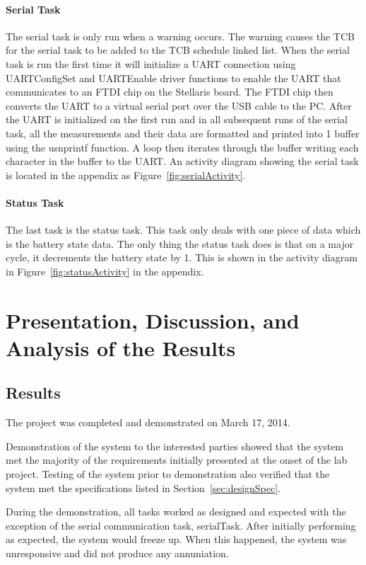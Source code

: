 \documentclass[12pt]{article} %
\begin{document}
    \paragraph{Serial Task} The serial task is only run when a warning occurs.
    The warning causes the TCB for the serial task to be added to the TCB
    schedule linked list. When the serial task is run the first time it will
    initialize a UART connection using UARTConfigSet and UARTEnable driver
    functions to enable the UART that communicates to an FTDI chip on the
    Stellaris board. The FTDI chip then converts the UART to a virtual serial
    port over the USB cable to the PC. After the UART is initialized on the
    first run and in all subsequent runs of the serial task, all the
    measurements and their data are formatted and printed into 1 buffer using
    the usnprintf function. A loop then iterates through the buffer writing
    each character in the buffer to the UART. An activity diagram showing the
    serial task is located in the appendix as Figure~\ref{fig:serialActivity}.
    
    \paragraph{Status Task}
    The last task is the status task. This task only deals with one piece of data
    which is the battery state data. The only thing the status task does is that on
    a major cycle, it decrements the battery state by 1. This is shown in the
    activity diagram in Figure~\ref{fig:statusActivity} in the appendix.

    \section{Presentation, Discussion, and Analysis of the Results}

    \subsection{Results} 
    The project was completed and demonstrated on March 17, 2014.

    Demonstration of the system to the interested parties showed that the
    system met the majority of the requirements initially presented at the onset of the lab
    project.  Testing of the system prior to demonstration also verified that
    the system met the specifications listed in Section~\ref{sec:designSpec}.

    During the demonstration, all tasks worked as designed and expected with
    the exception of the serial communication task, serialTask. After initially
    performing as expected, the system would freeze up. When this happened, the
    system was unresponsive and did not produce any annuniation.
\end{document}
